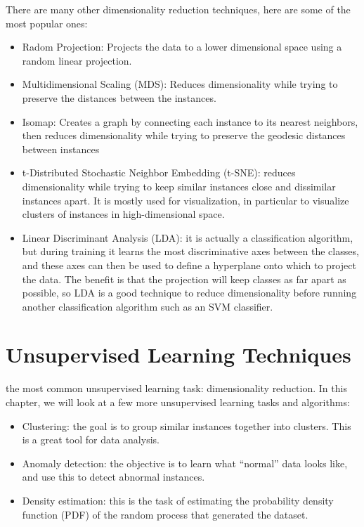 \documentclass[french]{article}
\begin{document}
There are many other dimensionality reduction techniques, here are some of the most popular ones:
\begin{itemize}
    \item Radom Projection: Projects the data to a lower dimensional space using a random linear projection.
    \item Multidimensional Scaling (MDS): Reduces dimensionality while trying to preserve the distances between the instances.
    \item Isomap: Creates a graph by connecting each instance to its nearest neighbors, then reduces dimensionality while trying to preserve the geodesic distances between instances
    \item t-Distributed Stochastic Neighbor Embedding (t-SNE): reduces dimensionality while trying to keep similar instances close and dissimilar instances apart. It is mostly used for visualization, in particular to visualize clusters of instances in high-dimensional space.
    \item Linear Discriminant Analysis (LDA): it is actually a classification algorithm, but during training it learns the most discriminative axes between the classes, and these axes can then be used to define a hyperplane onto which to project the data. The benefit is that the projection will keep classes as far apart as possible, so LDA is a good technique to reduce dimensionality before running another classification algorithm such as an SVM classifier.
\end{itemize}

\section{Unsupervised Learning Techniques}

the most common unsupervised learning task: dimensionality reduction. In this chapter, we will look at a few more unsupervised learning tasks and algorithms:

\begin{itemize}
    \item Clustering: the goal is to group similar instances together into clusters. This is a great tool for data analysis.
    \item Anomaly detection: the objective is to learn what “normal” data looks like, and use this to detect abnormal instances.
    \item Density estimation: this is the task of estimating the probability density function (PDF) of the random process that generated the dataset.
\end{itemize}
\end{document}
